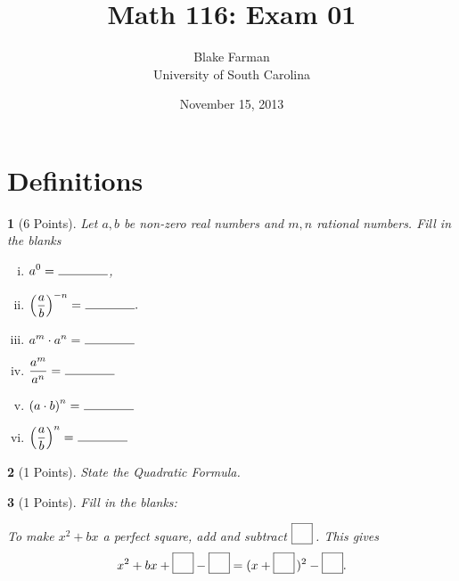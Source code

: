 \documentclass[12pt]{amsart}
\author{Blake Farman\\University of South Carolina}
\title{Math 116: Exam 01}
\date{November 15, 2013}
\begin{document}
\maketitle

\begin{center}
\end{center}

\vspace{0.2in}
\vspace{0.2in}

\theoremstyle{plain}
\newtheorem{thm}{}
\newtheorem{lem}{Lemma}
\theoremstyle{definition}
\newtheorem{defn}{Definition}

\section{Definitions}

\begin{thm}[6 Points]\label{ex2}
  Let $a, b$ be non-zero real numbers and $m, n$ rational numbers.
  Fill in the blanks
  \begin{enumerate}[(i)]
  \item
    $\displaystyle{a^0 =\ \line(1,0){40}}$,
  \item
    $\displaystyle{\left(\frac{a}{b}\right)^{-n} =\ \line(1,0){40}}.$
  \item
    $\displaystyle{a^m \cdot a^n =\ \line(1,0){40}}$
  \item
    $\displaystyle{\frac{a^m}{a^n} =\ \line(1,0){40}}$
  \item
    $\displaystyle{\left(a \cdot b\right)^n =\ \line(1,0){40}}$
  \item
    $\displaystyle{\left(\frac{a}{b}\right)^n =\ \line(1,0){40}}$
  \end{enumerate}
\end{thm}

\newpage

\begin{thm}[1 Points]\label{ex3}
  State the Quadratic Formula.
  \vspace{1in}
\end{thm}

\begin{thm}[1 Points]\label{ex4}
  Fill in the blanks:\\
  \begin{center}
    To make $x^2 + bx$ a perfect square, add and subtract $\fbox{\raisebox{10px}{\hspace{10px}}}$\,.
    This gives
    $$x^2 + bx + \fbox{\raisebox{10px}{\hspace{10px}}} - \fbox{\raisebox{10px}{\hspace{10px}}} = (x + \fbox{\raisebox{10px}{\hspace{10px}}}\,)^2 - \fbox{\raisebox{10px}{\hspace{10px}}}.$$
  \end{center}
\end{thm}
\end{document}
